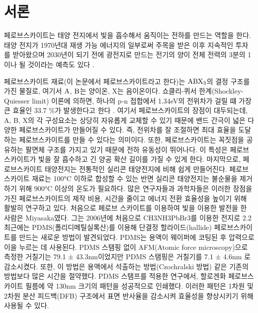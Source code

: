 
\section{서론}

페로브스카이트는 태양 전지에서 빛을 흡수해서 움직이는 전하를 만드는 역할을 한다. 태양 전지가 1970년대 재생 가능 에너지의 일부로써 주목을 받은 이후 지속적인 투자를 받아왔으며 2030년이 되기 전에 광전지로 만드는 전기의 양이 전체 전력의 3분의 1이나 될 것이라는 예측도 있다 \cite{turner2013global}. 

페로브스카이트 재료(이 논문에서 페로브스카이트라고 한다)는 $\rm{ABX_3}$의 결정 구조를 가진 물질로, 여기서 $\rm{A}$, $\rm{B}$는 양이온, X는 음이온이다. 쇼클리-퀴서 한계(Shockley-Quiesser limit) 이론에 의하면, 하나의 p-n 접합에서 1.34eV의 전위차가 걸릴 떄 가장 큰 효율인 33.7 \%가 발생한다고 한다 \cite{ruhle2016tabulated}. 여기서 페로브스카이트의 장점이 대두되는데, A, B, X의 각 구성요소는 상당히 자유롭게 교체할 수 있기 때문에 밴드 간극이 넓은 다양한 페로브스카이트가 만들어질 수 있다. 즉, 전위차를 잘 조절하면 최대 효율을 도달하는 페로브스카이트를 만들 수 있다는 의미이다. 또한, 페로브스카이트는 꼭짓점을 공유하는 팔면체 구조를 가지고 있기 때문에 전하 유동성이 뛰어나다\cite{linaburg2015studies}. 이 특성은 페로브스카이트가 빛을 잘 흡수하고 긴 양공 확산 길이를 가질 수 있게 한다. 마지막으로, 페로브스카이트 태양전지는 전통적인 실리콘 태양전지에 비해 쉽게 만들어진다. 페로브스카이트 재료는 100°C 이하로 합성할 수 있는 반면 실리콘 태양전지는 불순물을 제거하기 위해 900°C 이상의 온도가 필요하다.
많은 연구자들과 과학자들은 이러한 장점을 가진 페로브스카이트의 제작 비용, 시간을 줄이고 에너지 전환 효율성을 높이기 위해 활발히 연구하고 있다. 처음으로 페로브 스카이트를 이용하여 빛을 이용한 발전을 한 사람은 Miyasaka였다. 그는 2006년에 처음으로 CH3NH3PbBr3를 이용한 전지로 2.2%
최근에는 PDMS(폴리디메틸실록산)를 이용해 단결정 할라이드(hallide) 페로브스카이트를 만드는 새로운 방법이 발견되었다. PDMS는 용액이 웨이퍼에 코팅된 후 압력으로 이을 누르는 데 사용된다. PDMS 스탬핑 없이 AFM(Atomic force microscopy)으로 측정한 거칠기는 79.1 ± 43.3nm이었지만 PDMS 스탬핑은 거칠기를 7.1 ± 4.6nm 로 감소시켰다\cite{khoram2016growth}. 또한, 이 방법은 용액에서 석출하는 방법(Czochralski 방법) 같은 기존의 방법보다 많은 시간을 절약했다. PDMS 스탬프를 적용한 연구에서, 할로겐화 페로브스카이트 필름에 약 130nm 크기의 패턴을 성공적으로 인쇄했다\cite{brittman2017controlling}. 이러한 패턴은 1차원 및 2차원 분산 피드백(DFB) 구조에서 표면 반사율을 감소시켜 효율성을 향상시키기 위해 사용될 수 있다. 
